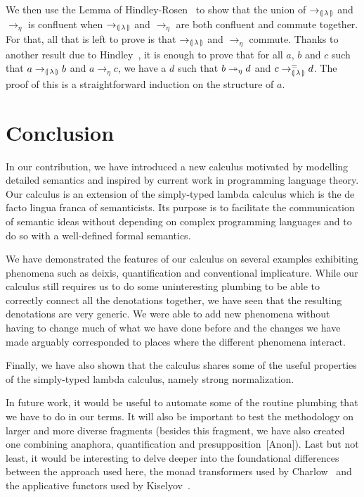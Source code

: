 \documentclass{llncs}
\begin{document}
We then use the Lemma of Hindley-Rosen~\cite{klop1992term} to show that the
union of $\to_{\llparenthesis \, \lambda \, \rrparenthesis}$ and $\to_\eta$ is confluent when
$\to_{\llparenthesis \, \lambda \, \rrparenthesis}$ and $\to_\eta$ are both confluent and commute
together. For that, all that is left to prove is that
$\to_{\llparenthesis \, \lambda \, \rrparenthesis}$ and $\to_\eta$ commute. Thanks to another result
due to Hindley~\cite{klop1992term}, it is enough to prove that for all $a$,
$b$ and $c$ such that $a \to_{\llparenthesis \, \lambda \, \rrparenthesis} b$ and $a \to_\eta c$, we
have a $d$ such that $b \twoheadrightarrow_\eta d$ and $c \to^=_{\llparenthesis \, \lambda \, \rrparenthesis}
d$. The proof of this is a straightforward induction on the structure of
$a$.


\section{Conclusion}
\label{sec:conclusion}

In our contribution, we have introduced a new calculus motivated by
modelling detailed semantics and inspired by current work in programming
language theory. Our calculus is an extension of the simply-typed lambda
calculus which is the de facto lingua franca of semanticists. Its purpose
is to facilitate the communication of semantic ideas without depending on
complex programming languages and to do so with a well-defined formal
semantics.

We have demonstrated the features of our calculus on several examples
exhibiting phenomena such as deixis, quantification and conventional
implicature. While our calculus still requires us to do some uninteresting
plumbing to be able to correctly connect all the denotations together, we
have seen that the resulting denotations are very generic. We were able to
add new phenomena without having to change much of what we have done before
and the changes we have made arguably corresponded to places where the
different phenomena interact.

Finally, we have also shown that the calculus shares some of the useful
properties of the simply-typed lambda calculus, namely strong
normalization.

In future work, it would be useful to automate some of the routine plumbing
that we have to do in our terms. It will also be important to test the
methodology on larger and more diverse fragments (besides this fragment, we
have also created one combining anaphora, quantification and
presupposition~[Anon]). Last but not least, it would be interesting to
delve deeper into the foundational differences between the approach used
here, the monad transformers used by Charlow~\cite{charlow2014semantics}
and the applicative functors used by
Kiselyov~\cite{kiselyov2015applicative}.


%
%


\end{document}

